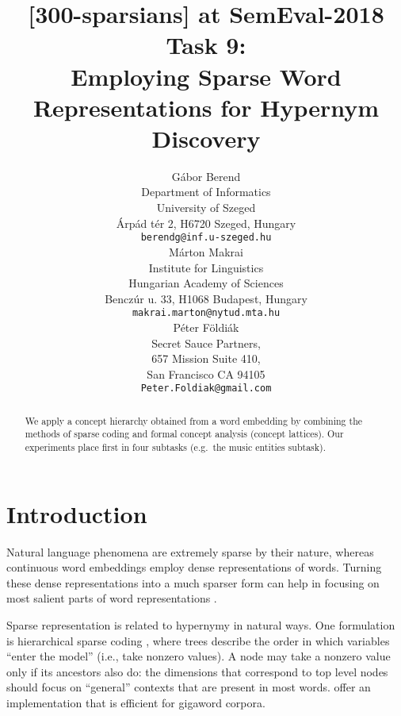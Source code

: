 \documentclass[11pt,a4paper]{article}
\title{[300-sparsians] at SemEval-2018 Task 9: \\
Employing Sparse Word Representations for Hypernym Discovery}
\author{Gábor Berend \\
Department of Informatics \\ University of Szeged \\
Árpád tér 2, H6720 Szeged, Hungary \\
{\tt berendg@inf.u-szeged.hu} \\\And
  Márton Makrai  \\
  Institute for Linguistics \\
  Hungarian Academy of Sciences \\
  Benczúr u. 33, H1068 Budapest, Hungary \\
  {\tt makrai.marton@nytud.mta.hu} \\\AND
  Péter Földiák \\
  Secret Sauce Partners, \\
  657 Mission Suite 410, \\
  San Francisco CA 94105 \\
  {\tt Peter.Foldiak@gmail.com} \\}
\date{}
\begin{document}
\maketitle

\begin{abstract}
  We apply a concept hierarchy obtained from a word embedding by combining the
  methods of sparse coding and formal concept analysis (concept lattices).
  Our experiments place first in four subtasks (e.g.~the music entities
  subtask).
\end{abstract}




\section{Introduction}

Natural language phenomena are extremely sparse by their nature, whereas
continuous word embeddings employ dense representations of words. Turning
these dense representations into a much sparser form can help in focusing on
most salient parts of word representations
\citep{Faruqui:2015,Berend:2017,Subramanian:2018}.

Sparse representation is related to hypernymy in natural ways.
One formulation is hierarchical sparse coding \citep{Zhao:2009}, where trees
describe the order in which variables “enter the model” (i.e., take nonzero
values). A node may take a nonzero value only if its ancestors also do: the
dimensions that correspond to top level nodes should focus on “general”
contexts that are present in most words. \citep{Yogatama:2015} offer an
implementation that is efficient for gigaword corpora.
\end{document}
